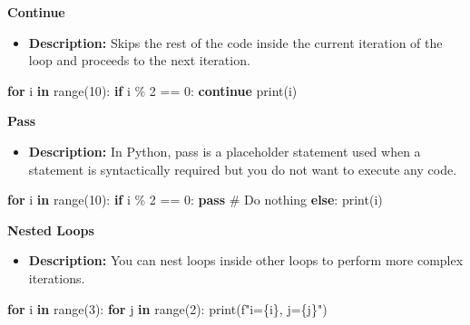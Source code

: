\documentclass[
  letterpaper,
  DIV=11,
  numbers=noendperiod]{scrreprt}
\newenvironment{Shaded}{\begin{snugshade}}{\end{snugshade}}
\newcommand{\BuiltInTok}[1]{\textcolor[rgb]{0.00,0.23,0.31}{#1}}
\newcommand{\CommentTok}[1]{\textcolor[rgb]{0.37,0.37,0.37}{#1}}
\newcommand{\ControlFlowTok}[1]{\textcolor[rgb]{0.00,0.23,0.31}{\textbf{#1}}}
\newcommand{\DecValTok}[1]{\textcolor[rgb]{0.68,0.00,0.00}{#1}}
\newcommand{\KeywordTok}[1]{\textcolor[rgb]{0.00,0.23,0.31}{\textbf{#1}}}
\newcommand{\NormalTok}[1]{\textcolor[rgb]{0.00,0.23,0.31}{#1}}
\newcommand{\OperatorTok}[1]{\textcolor[rgb]{0.37,0.37,0.37}{#1}}
\newcommand{\SpecialCharTok}[1]{\textcolor[rgb]{0.37,0.37,0.37}{#1}}
\newcommand{\SpecialStringTok}[1]{\textcolor[rgb]{0.13,0.47,0.30}{#1}}
\providecommand{\tightlist}{%
  \setlength{\itemsep}{0pt}\setlength{\parskip}{0pt}}
\begin{document}
\begin{tcolorbox}[enhanced jigsaw, colframe=quarto-callout-note-color-frame, toprule=.15mm, bottomrule=.15mm, rightrule=.15mm, colback=white, breakable, arc=.35mm, opacityback=0, left=2mm, leftrule=.75mm]
\textbf{Continue}

\begin{itemize}
\tightlist
\item
  \textbf{Description:} Skips the rest of the code inside the current
  iteration of the loop and proceeds to the next iteration.
\end{itemize}

\begin{Shaded}
\begin{Highlighting}[]
\ControlFlowTok{for}\NormalTok{ i }\KeywordTok{in} \BuiltInTok{range}\NormalTok{(}\DecValTok{10}\NormalTok{):}
    \ControlFlowTok{if}\NormalTok{ i }\OperatorTok{\%} \DecValTok{2} \OperatorTok{==} \DecValTok{0}\NormalTok{:}
        \ControlFlowTok{continue}
    \BuiltInTok{print}\NormalTok{(i)}
\end{Highlighting}
\end{Shaded}

\textbf{Pass}

\begin{itemize}
\tightlist
\item
  \textbf{Description:} In Python, pass is a placeholder statement used
  when a statement is syntactically required but you do not want to
  execute any code.
\end{itemize}

\begin{Shaded}
\begin{Highlighting}[]
\ControlFlowTok{for}\NormalTok{ i }\KeywordTok{in} \BuiltInTok{range}\NormalTok{(}\DecValTok{10}\NormalTok{):}
    \ControlFlowTok{if}\NormalTok{ i }\OperatorTok{\%} \DecValTok{2} \OperatorTok{==} \DecValTok{0}\NormalTok{:}
        \ControlFlowTok{pass}  \CommentTok{\# Do nothing}
    \ControlFlowTok{else}\NormalTok{:}
        \BuiltInTok{print}\NormalTok{(i)}
\end{Highlighting}
\end{Shaded}

\textbf{Nested Loops}

\begin{itemize}
\tightlist
\item
  \textbf{Description:} You can nest loops inside other loops to perform
  more complex iterations.
\end{itemize}

\begin{Shaded}
\begin{Highlighting}[]
\ControlFlowTok{for}\NormalTok{ i }\KeywordTok{in} \BuiltInTok{range}\NormalTok{(}\DecValTok{3}\NormalTok{):}
    \ControlFlowTok{for}\NormalTok{ j }\KeywordTok{in} \BuiltInTok{range}\NormalTok{(}\DecValTok{2}\NormalTok{):}
        \BuiltInTok{print}\NormalTok{(}\SpecialStringTok{f"i=}\SpecialCharTok{\{}\NormalTok{i}\SpecialCharTok{\}}\SpecialStringTok{, j=}\SpecialCharTok{\{}\NormalTok{j}\SpecialCharTok{\}}\SpecialStringTok{"}\NormalTok{)}
\end{Highlighting}
\end{Shaded}


\end{tcolorbox}
\end{document}
